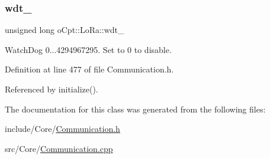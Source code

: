 \subsubsection{\texorpdfstring{wdt\+\_\+}{wdt\_}}
{\footnotesize\ttfamily unsigned long o\+Cpt\+::\+Lo\+Ra\+::wdt\+\_\+\hspace{0.3cm}{\ttfamily [protected]}}



Watch\+Dog 0...4294967295. Set to 0 to disable. 



Definition at line 477 of file Communication.\+h.



Referenced by initialize().



The documentation for this class was generated from the following files\+:\begin{DoxyCompactItemize}
\item 
include/\+Core/\hyperlink{_communication_8h}{Communication.\+h}\item 
src/\+Core/\hyperlink{_communication_8cpp}{Communication.\+cpp}\end{DoxyCompactItemize}
